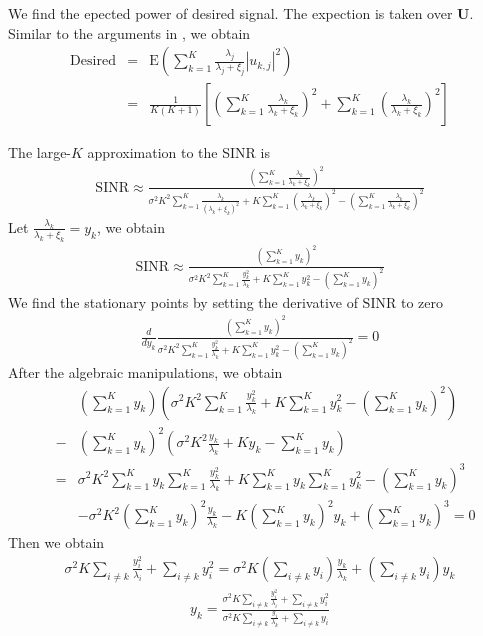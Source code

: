 \documentclass[12pt,journal,draftclsnofoot,onecolumn]{IEEEtran}
\begin{document}
We find the epected power of desired signal. The expection is taken over $\mathbf{U}$. Similar to the arguments in \cite{peel2005vector}, we obtain
\begin{eqnarray}
\mathrm{Desired} &=& \mathrm{E}\left(\sum_{k = 1}^{K}\frac{\lambda_j}{\lambda_j + \xi_j}|u_{k,j}|^2\right)\\
&=&\frac{1}{K(K+1)}\left[\left(\sum_{k=1}^{K}\frac{\lambda_k}{\lambda_k + \xi_k}\right)^2 + \sum_{k = 1}^{K}\left(\frac{\lambda_k}{\lambda_k + \xi_k}\right)^2\right]	
\end{eqnarray}

The large-$K$ approximation to the SINR is
\begin{eqnarray}
\mathrm{SINR} \approx \frac{\left(\sum_{k=1}^{K}\frac{\lambda_k}{\lambda_k + \xi_k}\right)^2}{\sigma^2K^2\sum_{k=1}^{K}\frac{\lambda_k}{(\lambda_k + \xi_k)^2} +	 K\sum_{k = 1}^{K}\left(\frac{\lambda_k}{\lambda_k + \xi_k}\right)^2 - \left(\sum_{k=1}^{K}\frac{\lambda_k}{\lambda_k + \xi_k}\right)^2}
\end{eqnarray}
Let $\frac{\lambda_k}{\lambda_k + \xi_k} = y_k$, we obtain
\begin{eqnarray}
\mathrm{SINR} \approx \frac{\left(\sum_{k=1}^{K}y_k\right)^2}{\sigma^2K^2\sum_{k=1}^{K}\frac{y_k^2}{\lambda_k} +	 K\sum_{k=1}^{K}y_k^2 - \left(\sum_{k=1}^{K}y_k\right)^2}
\end{eqnarray}
We find the stationary points by setting the derivative of $\mathrm{SINR}$ to zero
\begin{eqnarray}
\frac{d}{dy_k} \frac{\left(\sum_{k=1}^{K}y_k\right)^2}{\sigma^2K^2\sum_{k=1}^{K}\frac{y_k^2}{\lambda_k} +	 K\sum_{k=1}^{K}y_k^2 - \left(\sum_{k=1}^{K}y_k\right)^2} = 0
\end{eqnarray}
After the algebraic manipulations, we obtain
\begin{eqnarray}
&&\left(\sum_{k=1}^{K}y_k\right)\left(\sigma^2K^2\sum_{k=1}^{K}\frac{y_k^2}{\lambda_k} +	 K\sum_{k=1}^{K}y_k^2 - \left(\sum_{k=1}^{K}y_k\right)^2\right) \\
&-& \left(\sum_{k=1}^{K}y_k\right)^2\left(\sigma^2K^2\frac{y_k}{\lambda_k} + Ky_k - \sum_{k=1}^{K}y_k\right)\\
&=&\sigma^2K^2\sum_{k=1}^{K}y_k\sum_{k=1}^{K}\frac{y_k^2}{\lambda_k} + K\sum_{k=1}^{K}y_k\sum_{k=1}^{K}y_k^2- \left(\sum_{k=1}^{K}y_k\right)^3\\
&& - \sigma^2K^2\left(\sum_{k=1}^{K}y_k\right)^2\frac{y_k}{\lambda_k} - K\left(\sum_{k=1}^{K}y_k\right)^2y_k + \left(\sum_{k=1}^{K}y_k\right)^3 = 0
\end{eqnarray}
Then we obtain
\begin{eqnarray}
\sigma^2K\sum_{i \neq k}\frac{y_i^2}{\lambda_i} + \sum_{i\neq k}y_i^2 = \sigma^2K\left(\sum_{i\neq k}y_i\right)\frac{y_k}{\lambda_k} +\left( \sum_{i\neq k}y_i\right)y_k
\end{eqnarray}
\begin{eqnarray}
y_k = \frac{\sigma^2K\sum_{i \neq k}\frac{y_i^2}{\lambda_i} + \sum_{i\neq k}y_i^2}{\sigma^2K\sum_{i \neq k}\frac{y_i}{\lambda_k} + \sum_{i\neq k}y_i}
\end{eqnarray}
\end{document}
